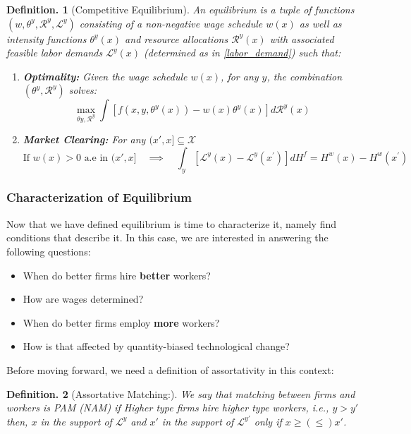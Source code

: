 \documentclass[12pt]{article}
\newtheorem{defin}{Definition.}
\theoremstyle{definition}
\begin{document}
\begin{defin}[Competitive Equilibrium]
An equilibrium is a tuple of functions $\left(w, \theta^{y}, \mathcal{R}^{y}, \mathcal{L}^{y}\right)$ consisting of a non-negative wage schedule $w(x)$ as well as intensity functions $\theta^{y}(x)$ and resource allocations $\mathcal{R}^{y}(x)$ with associated feasible labor demands $\mathcal{L}^{y}(x)$ (determined as in \eqref{labor_demand}) such that:
\begin{enumerate}
    \item \textbf{Optimality:} Given the wage schedule $w(x)$, for any $y$, the combination $\left(\theta^{y}, \mathcal{R}^{y}\right)$ solves:$$\max _{\theta y, \mathcal{R}^{y}} \int\left[f\left(x, y, \theta^{y}(x)\right)-w(x) \theta^{y}(x)\right] d \mathcal{R}^{y}(x)$$
    \item \textbf{Market Clearing:} For any $(x',x]\subseteq\mathcal{X}$
    $$\text{If } w(x)>0 \text{ a.e in } (x', x]  \quad \implies \quad   \int_{y}\left[\mathcal{L}^{y}(x)-\mathcal{L}^{y}\left(x^{\prime}\right)\right] d H^{f} = H^{w}(x)-H^{w}\left(x^{\prime}\right) $$
\end{enumerate}

\end{defin}

\subsubsection{Characterization of Equilibrium}
Now that we have defined equilibrium is time to characterize it, namely find conditions that describe it. In this case, we are interested in answering the following questions:
\begin{itemize}
    \item  When do better firms hire \textbf{better} workers?
    \item  How are wages determined?
    \item  When do better firms employ \textbf{more} workers?
    \item  How is that affected by quantity-biased technological change?
\end{itemize}

 Before moving forward, we need a definition of assortativity in this context:

\begin{defin}[Assortative Matching:] 
We say that matching between firms and workers is PAM (NAM) if Higher type firms hire higher type workers, i.e., $y>y'$ then, $x$ in the support of $\mathcal{L}^y$ and $x'$ in the support of $\mathcal{L}^{y'}$ only if $x\geq (\leq) x'$.
\end{defin}
\end{document}
